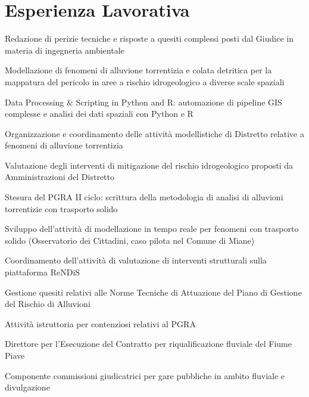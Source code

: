 
\section{Esperienza Lavorativa}

\begin{tightemize}
\item Redazione di perizie tecniche e risposte a quesiti complessi posti dal Giudice in materia di ingegneria ambientale
\end{tightemize}
\sectionsep

\begin{tightemize}
\item Modellazione di fenomeni di alluvione torrentizia e colata detritica per la mappatura del pericolo in aree a rischio idrogeologico a diverse scale spaziali
\item Data Processing \& Scripting in Python and R: automazione di pipeline GIS complesse e analisi dei dati spaziali con Python e R
\item Organizzazione e coordinamento delle attività modellistiche di Distretto relative a fenomeni di alluvione torrentizia
\item Valutazione degli interventi di mitigazione del rischio idrogeologico proposti da Amministrazioni del Distretto
\item Stesura del PGRA II ciclo: scrittura della metodologia di analisi di alluvioni torrentizie con trasporto solido
\item Sviluppo dell'attività di modellazione in tempo reale per fenomeni con trasporto solido (Osservatorio dei Cittadini, caso pilota nel Comune di Miane)
\item Coordinamento dell'attività di valutazione di interventi strutturali sulla piattaforma ReNDiS
\item Gestione quesiti relativi alle Norme Tecniche di Attuazione del Piano di Gestione del Rischio di Alluvioni
\item Attività istruttoria per contenziosi relativi al PGRA
\item Direttore per l'Esecuzione del Contratto per riqualificazione fluviale del Fiume Piave
\item Componente commissioni giudicatrici per gare pubbliche in ambito fluviale e divulgazione
\end{tightemize}
\sectionsep

